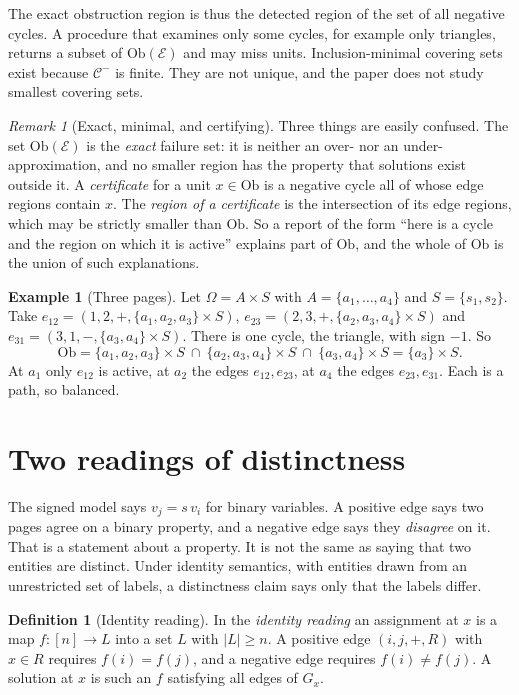 \documentclass[11pt]{article}
\theoremstyle{plain}
\theoremstyle{definition}
\newtheorem{definition}[theorem]{Definition}
\newtheorem{example}[theorem]{Example}
\theoremstyle{remark}
\newtheorem{remark}[theorem]{Remark}
\newcommand{\Om}{\Omega}
\newcommand{\Ob}{\mathrm{Ob}}
\begin{document}
The exact obstruction region is thus the detected region of the set of all negative cycles. A procedure that examines only some cycles, for example only triangles, returns a subset of $\Ob(\mathcal E)$ and may miss units. Inclusion-minimal covering sets exist because $\mathcal C^-$ is finite. They are not unique, and the paper does not study smallest covering sets.

\begin{remark}[Exact, minimal, and certifying]
Three things are easily confused. The set $\Ob(\mathcal E)$ is the \emph{exact} failure set: it is neither an over- nor an under-approximation, and no smaller region has the property that solutions exist outside it. A \emph{certificate} for a unit $x\in\Ob$ is a negative cycle all of whose edge regions contain $x$. The \emph{region of a certificate} is the intersection of its edge regions, which may be strictly smaller than $\Ob$. So a report of the form ``here is a cycle and the region on which it is active'' explains part of $\Ob$, and the whole of $\Ob$ is the union of such explanations.
\end{remark}

\begin{example}[Three pages]\label{ex:triangle}
Let $\Om=A\times S$ with $A=\{a_1,\dots,a_4\}$ and $S=\{s_1,s_2\}$. Take $e_{12}=(1,2,+,\{a_1,a_2,a_3\}\times S)$, $e_{23}=(2,3,+,\{a_2,a_3,a_4\}\times S)$ and $e_{31}=(3,1,-,\{a_3,a_4\}\times S)$. There is one cycle, the triangle, with sign $-1$. So
\[
\Ob=\{a_1,a_2,a_3\}\times S\ \cap\ \{a_2,a_3,a_4\}\times S\ \cap\ \{a_3,a_4\}\times S=\{a_3\}\times S .
\]
At $a_1$ only $e_{12}$ is active, at $a_2$ the edges $e_{12},e_{23}$, at $a_4$ the edges $e_{23},e_{31}$. Each is a path, so balanced.
\end{example}

\section{Two readings of distinctness}\label{sec:readings}

The signed model says $v_j=s\,v_i$ for binary variables. A positive edge says two pages agree on a binary property, and a negative edge says they \emph{disagree} on it. That is a statement about a property. It is not the same as saying that two entities are distinct. Under identity semantics, with entities drawn from an unrestricted set of labels, a distinctness claim says only that the labels differ.

\begin{definition}[Identity reading]\label{def:idreading}
In the \emph{identity reading} an assignment at $x$ is a map $f:[n]\to L$ into a set $L$ with $|L|\ge n$. A positive edge $(i,j,+,R)$ with $x\in R$ requires $f(i)=f(j)$, and a negative edge requires $f(i)\ne f(j)$. A solution at $x$ is such an $f$ satisfying all edges of $G_x$.
\end{definition}
\end{document}
